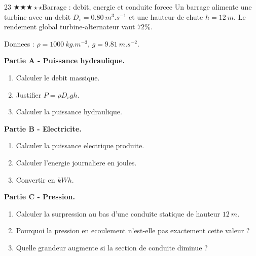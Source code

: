 \documentclass[11pt,a4paper]{article}
\newcommand{\diffthree}{\(\bigstar\bigstar\bigstar\star\star\)}
\begin{document}
\begin{probleme}{23 \diffthree}{Barrage : debit, energie et conduite forcee}
Un barrage alimente une turbine avec un debit \(D_v=\SI{0.80}{m^3.s^{-1}}\) et une hauteur de chute \(h=\SI{12}{m}\). Le rendement global turbine-alternateur vaut \(72\%\).

Donnees : \(\rho=\SI{1000}{kg.m^{-3}}\), \(g=\SI{9.81}{m.s^{-2}}\).

\textbf{Partie A - Puissance hydraulique.}
\begin{enumerate}
\item Calculer le debit massique.
\item Justifier \(P=\rho D_vgh\).
\item Calculer la puissance hydraulique.
\end{enumerate}

\textbf{Partie B - Electricite.}
\begin{enumerate}[resume]
\item Calculer la puissance electrique produite.
\item Calculer l'energie journaliere en joules.
\item Convertir en \(\si{kWh}\).
\end{enumerate}

\textbf{Partie C - Pression.}
\begin{enumerate}[resume]
\item Calculer la surpression au bas d'une conduite statique de hauteur \(\SI{12}{m}\).
\item Pourquoi la pression en ecoulement n'est-elle pas exactement cette valeur ?
\item Quelle grandeur augmente si la section de conduite diminue ?
\end{enumerate}
\end{probleme}
\end{document}
